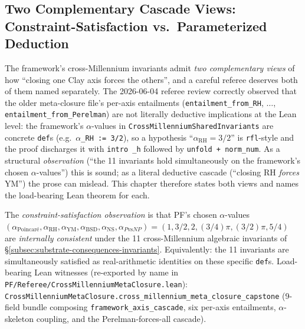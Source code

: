 \subsection{Two Complementary Cascade Views: Constraint-Satisfaction
vs.\ Parameterized Deduction}
\label{subsec:substrate-consequences-cascade-views}

\begin{warning}
The framework's cross-Millennium invariants admit \emph{two
complementary views} of how ``closing one Clay axis forces the
others'', and a careful referee deserves both of them named
separately. The 2026-06-04 referee review correctly observed that
the older meta-closure file's per-axis entailments
(\texttt{entailment\_from\_RH}, $\ldots$,
\texttt{entailment\_from\_Perelman}) are not literally deductive
implications at the Lean level: the framework's $\alpha$-values
in \texttt{Cross\allowbreak{}Millennium\allowbreak{}Shared\allowbreak{}Invariants} are concrete
\texttt{def}s (e.g.\ \texttt{\(\alpha\)\_RH := 3/2}), so a
hypothesis ``$\alpha_{\text{RH}} = 3/2$'' is \texttt{rfl}-style and
the proof discharges it with \texttt{intro \_h} followed by
\texttt{unfold + norm\_num}. As a structural \emph{observation}
(``the 11 invariants hold simultaneously on the framework's chosen
$\alpha$-values'') this is sound; as a literal deductive cascade
(``closing RH \emph{forces} YM'') the prose can mislead. This
chapter therefore states both views and names the load-bearing
Lean theorem for each.
\end{warning}

\begin{definition}
\label{def:cascade-view-constraint-satisfaction}
The \emph{constraint-satisfaction observation} is that PF's chosen
$\alpha$-values
$(\alpha_{\text{Poincar\'e}}, \alpha_{\text{RH}}, \alpha_{\text{YM}},
\alpha_{\text{BSD}}, \alpha_{\text{NS}}, \alpha_{P\text{vs}NP})
= (1, 3/2, 2, (3/4)\pi, (3/2)\pi, 5/4)$ are \emph{internally
consistent} under the 11 cross-Millennium algebraic invariants of
\S\ref{subsec:substrate-consequences-invariants}. Equivalently:
the 11 invariants are simultaneously satisfied as real-arithmetic
identities on these specific \texttt{def}s. Load-bearing Lean
witnesses (re-exported by name in
\texttt{PF/\allowbreak{}Referee/\allowbreak{}Cross\allowbreak{}Millennium\allowbreak{}Meta\allowbreak{}Closure.\allowbreak{}lean}):
\texttt{Cross\allowbreak{}Millennium\allowbreak{}Meta\allowbreak{}Closure.cross\_\allowbreak{}millennium\_\allowbreak{}meta\_\allowbreak{}closure\_\allowbreak{}capstone}
(9-field bundle composing \texttt{framework\_axis\_cascade},
six per-axis entailments, $\alpha$-skeleton coupling, and the
Perelman-forces-all cascade).
\end{definition}

